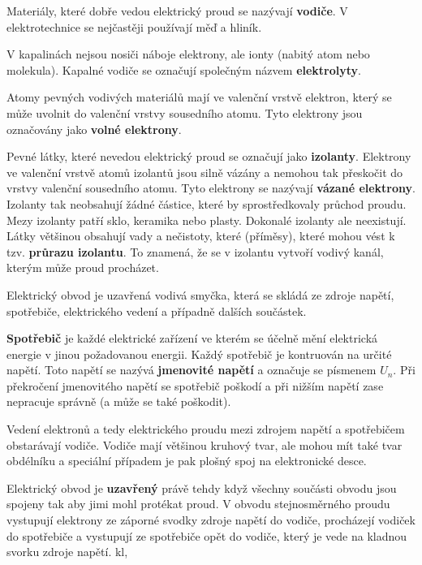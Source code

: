 \vskip 4mm
\vskip 4mm



Materiály, které dobře vedou elektrický proud se nazývají {\bf vodiče}. V elektrotechnice se nejčastěji používají měď a hliník. 

V kapalinách nejsou nosiči náboje elektrony, ale ionty (nabitý atom nebo molekula). Kapalné vodiče se označují společným názvem {\bf elektrolyty}. 

Atomy pevných vodivých materiálů mají ve valenční vrstvě elektron, který se může uvolnit do valenční vrstvy sousedního atomu. Tyto elektrony jsou označovány jako {\bf volné elektrony}. 

Pevné látky, které nevedou elektrický proud se označují jako {\bf izolanty}. Elektrony ve valenční vrstvě atomů izolantů jsou silně vázány a nemohou tak přeskočit do vrstvy valenční sousedního atomu. Tyto elektrony se nazývají {\bf vázané elektrony}. Izolanty tak neobsahují žádné částice, které by sprostředkovaly průchod proudu. Mezy izolanty patří sklo, keramika nebo plasty. Dokonalé izolanty ale neexistují. Látky většinou obsahují vady a nečistoty, které (příměsy), které mohou vést k tzv. {\bf průrazu izolantu}. To znamená, že se v izolantu vytvoří vodivý kanál, kterým může proud procházet.



Elektrický obvod je uzavřená vodivá smyčka, která se skládá ze zdroje napětí, spotřebiče, elektrického vedení a případně dalších součástek.

{\bf Spotřebič} je každé elektrické zařízení ve kterém se účelně mění elektrická energie v jinou požadovanou energii. Každý spotřebič je kontruován na určité napětí. Toto napětí se nazývá {\bf jmenovité napětí} a označuje se písmenem $U_n$. Při překročení jmenovitého napětí se spotřebič poškodí a při nižším napětí zase nepracuje správně (a může se také poškodit). 

Vedení elektronů a tedy elektrického proudu mezi zdrojem napětí a spotřebičem obstarávají vodiče. Vodiče mají většinou kruhový tvar, ale mohou mít také tvar obdélníku a speciální případem je pak plošný spoj na elektronické desce.

Elektrický obvod je {\bf uzavřený} právě tehdy když všechny součásti obvodu jsou spojeny tak aby jimi mohl protékat proud. V obvodu stejnosměrného proudu vystupují elektrony ze záporné svodky zdroje napětí do vodiče, procházejí vodiček do spotřebiče a vystupují ze spotřebiče opět do vodiče, který je vede na kladnou svorku zdroje napětí. kl, 


